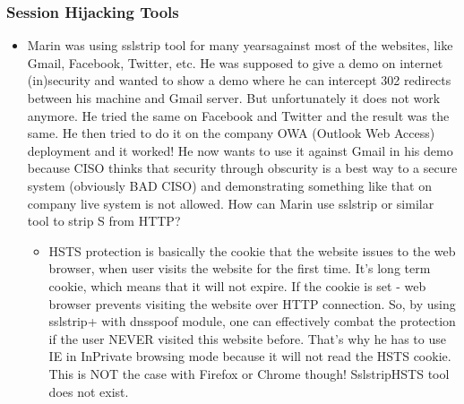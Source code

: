 \subsubsection{Session Hijacking Tools}
\begin{itemize}
    \item Marin was using sslstrip tool for many yearsagainst most of the websites, like Gmail, Facebook, Twitter, etc. He was supposed to give a demo on internet (in)security and wanted to show a demo where he can intercept 302 redirects between his machine and Gmail server. But unfortunately it does not work anymore. He tried the same on Facebook and Twitter and the result was the same. He then tried to do it on the company OWA (Outlook Web Access) deployment and it worked! He now wants to use it against Gmail in his demo because CISO thinks that security through obscurity is a best way to a secure system (obviously BAD CISO) and demonstrating something like that on company live system is not allowed. How can Marin use sslstrip or similar tool to strip S from HTTP?
    \begin{itemize}
        \item HSTS protection is basically the cookie that the website issues to the web browser, when user visits the website for the first time. It's long term cookie, which means that it will not expire. If the cookie is set - web browser prevents visiting the website over HTTP connection. So, by using sslstrip+ with dnsspoof module, one can effectively combat the protection if the user NEVER visited this website before. That's why he has to use IE in InPrivate browsing mode because it will not read the HSTS cookie. This is NOT the case with Firefox or Chrome though!
        SslstripHSTS tool does not exist.
    \end{itemize}
\end{itemize}
